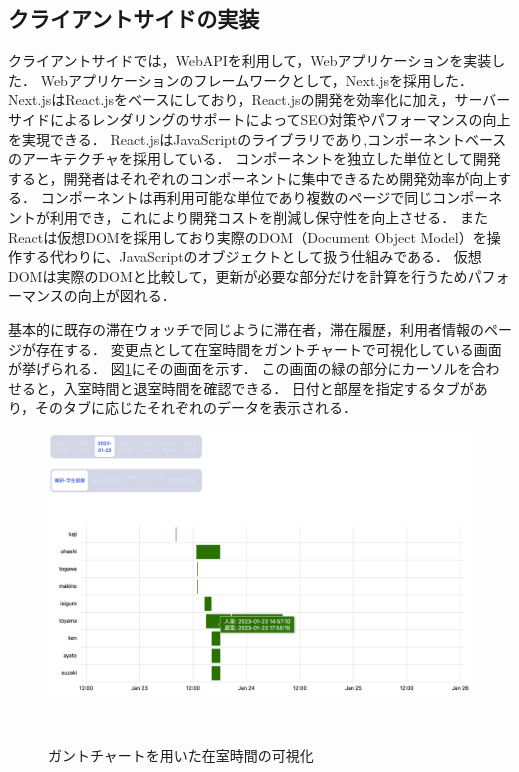 

\subsection{クライアントサイドの実装}\label{4.1.2}
クライアントサイドでは，WebAPIを利用して，Webアプリケーションを実装した．
Webアプリケーションのフレームワークとして，Next.jsを採用した．
Next.jsはReact.jsをベースにしており，React.jsの開発を効率化に加え，サーバーサイドによるレンダリングのサポートによってSEO対策やパフォーマンスの向上を実現できる．
React.jsはJavaScriptのライブラリであり,コンポーネントベースのアーキテクチャを採用している．
コンポーネントを独立した単位として開発すると，開発者はそれぞれのコンポーネントに集中できるため開発効率が向上する．
コンポーネントは再利用可能な単位であり複数のページで同じコンポーネントが利用でき，これにより開発コストを削減し保守性を向上させる．
またReactは仮想DOMを採用しており実際のDOM（Document Object Model）を操作する代わりに、JavaScriptのオブジェクトとして扱う仕組みである．
仮想DOMは実際のDOMと比較して，更新が必要な部分だけを計算を行うためパフォーマンスの向上が図れる．



基本的に既存の滞在ウォッチで同じように滞在者，滞在履歴，利用者情報のページが存在する．
変更点として在室時間をガントチャートで可視化している画面が挙げられる．
図\ref{fig:gantt}にその画面を示す．
この画面の緑の部分にカーソルを合わせると，入室時間と退室時間を確認できる．
日付と部屋を指定するタブがあり，そのタブに応じたそれぞれのデータを表示される．

\begin{figure}[tbh]
  \centering
  \includegraphics[width=15cm]{image/gantt.png}
  \caption{ガントチャートを用いた在室時間の可視化}　\label{fig:gantt}
\end{figure}



